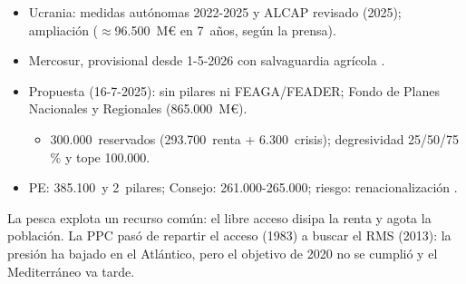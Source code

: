 \documentclass{article}
\begin{document}
\begin{columnas}
\begin{itemize}
\item Ucrania: medidas autónomas 2022-2025 y ALCAP revisado (2025); ampliación ($\approx$96.500~M€ en 7~años, según la prensa).
\item Mercosur, provisional desde 1-5-2026 con salvaguardia agrícola .
\end{itemize}
\begin{itemize}
\item Propuesta (16-7-2025): sin pilares ni FEAGA/FEADER; Fondo de Planes Nacionales y Regionales (865.000~M€).
  \begin{itemize}
  \item 300.000~reservados (293.700~renta + 6.300~crisis); degresividad 25/50/75\,\% y tope 100.000.
  \end{itemize}
\item PE: 385.100~y 2~pilares; Consejo: 261.000-265.000; riesgo: renacionalización .
\end{itemize}

\begin{ideaclave}
La pesca explota un recurso común: el libre acceso disipa la renta y agota la población. La PPC pasó de repartir el acceso (1983) a buscar el RMS (2013): la presión ha bajado en el Atlántico, pero el objetivo de 2020 no se cumplió y el Mediterráneo va tarde.
\end{ideaclave}


\end{columnas}
\end{document}
